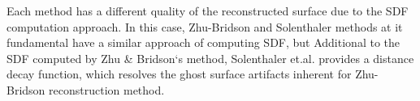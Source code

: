 Each method has a different quality of the reconstructed surface due to the SDF computation approach. In this case, Zhu-Bridson and Solenthaler methods at it fundamental have a similar approach of computing SDF, but Additional to the SDF computed by Zhu \& Bridson`s method,  Solenthaler et.al. provides a distance decay function, which resolves the ghost surface artifacts inherent for Zhu-Bridson reconstruction method.

